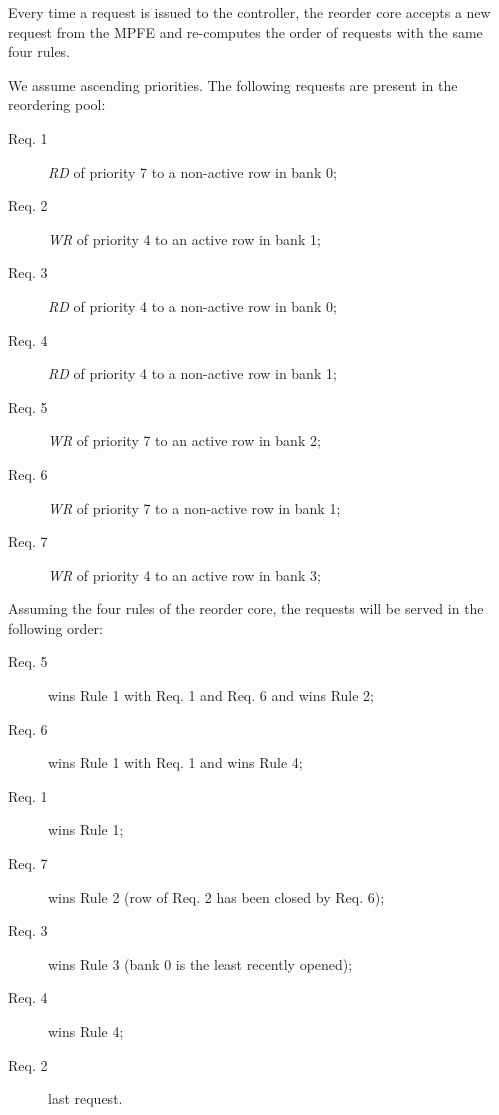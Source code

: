 \documentclass[main.tex]{subfiles}
\begin{document}
\begin{description}
        Every time a request is issued to the controller, the reorder core
        accepts a new request from the MPFE and re-computes the order of
        requests with the same four rules.

        \begin{example}
            We assume ascending priorities. The following requests are present
            in the reordering pool:
            \begin{description}
                \item[Req. 1] \emph{RD} of priority 7 to a non-active row in bank 0;
                \item[Req. 2] \emph{WR} of priority 4 to an active row in bank 1;
                \item[Req. 3] \emph{RD} of priority 4 to a non-active row in bank 0;
                \item[Req. 4] \emph{RD} of priority 4 to a non-active row in bank 1;
                \item[Req. 5] \emph{WR} of priority 7 to an active row in bank 2;
                \item[Req. 6] \emph{WR} of priority 7 to a non-active row in bank 1;
                \item[Req. 7] \emph{WR} of priority 4 to an active row in bank 3;
            \end{description}

            Assuming the four rules of the reorder core, the requests will be
            served in the following order:
            \begin{description}
                \item[Req. 5] wins Rule 1 with Req. 1 and Req. 6 and wins Rule 2;
                \item[Req. 6] wins Rule 1 with Req. 1 and wins Rule 4;
                \item[Req. 1] wins Rule 1;
                \item[Req. 7] wins Rule 2 (row of Req. 2 has been closed by Req. 6);
                \item[Req. 3] wins Rule 3 (bank 0 is the least recently opened);
                \item[Req. 4] wins Rule 4;
                \item[Req. 2] last request.
            \end{description}
        \end{example}
\end{description}
\end{document}
